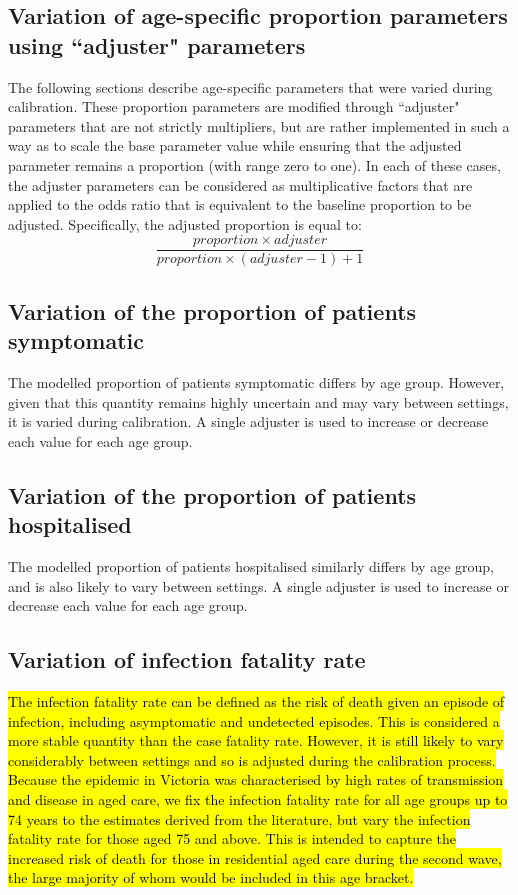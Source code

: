 \subsection{Variation of age-specific proportion parameters using ``adjuster" parameters}
The following sections describe age-specific parameters that were varied during calibration. These proportion parameters are modified through ``adjuster" parameters that are not strictly multipliers, but are rather implemented in such a way as to scale the base parameter value while ensuring that the adjusted parameter remains a proportion (with range zero to one). In each of these cases, the adjuster parameters can be considered as multiplicative factors that are applied to the odds ratio that is equivalent to the baseline proportion to be adjusted. Specifically, the adjusted proportion is equal to:
\[\frac{proportion \times adjuster}{proportion \times (adjuster-1)+1}\]

\subsection{Variation of the proportion of patients symptomatic}
The modelled proportion of patients symptomatic differs by age group. However, given that this quantity remains highly uncertain and may vary between settings, it is varied during calibration. A single adjuster is used to increase or decrease each value for each age group.

\subsection{Variation of the proportion of patients hospitalised}
The modelled proportion of patients hospitalised similarly differs by age group, and is also likely to vary between settings. A single adjuster is used to increase or decrease each value for each age group.

\subsection{Variation of infection fatality rate}
\label{var_ifr}
\hl{The infection fatality rate can be defined as the risk of death given an episode of infection, including asymptomatic and undetected episodes. This is considered a more stable quantity than the case fatality rate. However, it is still likely to vary considerably between settings and so is adjusted during the calibration process. Because the epidemic in Victoria was characterised by high rates of transmission and disease in aged care, we fix the infection fatality rate for all age groups up to 74 years to the estimates derived from the literature, but vary the infection fatality rate for those aged 75 and above. This is intended to capture the increased risk of death for those in residential aged care during the second wave, the large majority of whom would be included in this age bracket.}

